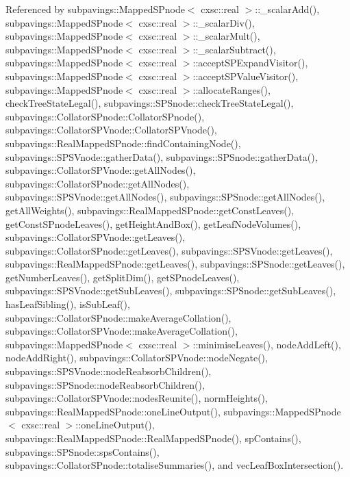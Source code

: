 \-Referenced by subpavings\-::\-Mapped\-S\-Pnode$<$ cxsc\-::real $>$\-::\-\_\-scalar\-Add(), subpavings\-::\-Mapped\-S\-Pnode$<$ cxsc\-::real $>$\-::\-\_\-scalar\-Div(), subpavings\-::\-Mapped\-S\-Pnode$<$ cxsc\-::real $>$\-::\-\_\-scalar\-Mult(), subpavings\-::\-Mapped\-S\-Pnode$<$ cxsc\-::real $>$\-::\-\_\-scalar\-Subtract(), subpavings\-::\-Mapped\-S\-Pnode$<$ cxsc\-::real $>$\-::accept\-S\-P\-Expand\-Visitor(), subpavings\-::\-Mapped\-S\-Pnode$<$ cxsc\-::real $>$\-::accept\-S\-P\-Value\-Visitor(), subpavings\-::\-Mapped\-S\-Pnode$<$ cxsc\-::real $>$\-::allocate\-Ranges(), check\-Tree\-State\-Legal(), subpavings\-::\-S\-P\-Snode\-::check\-Tree\-State\-Legal(), subpavings\-::\-Collator\-S\-Pnode\-::\-Collator\-S\-Pnode(), subpavings\-::\-Collator\-S\-P\-Vnode\-::\-Collator\-S\-P\-Vnode(), subpavings\-::\-Real\-Mapped\-S\-Pnode\-::find\-Containing\-Node(), subpavings\-::\-S\-P\-S\-Vnode\-::gather\-Data(), subpavings\-::\-S\-P\-Snode\-::gather\-Data(), subpavings\-::\-Collator\-S\-P\-Vnode\-::get\-All\-Nodes(), subpavings\-::\-Collator\-S\-Pnode\-::get\-All\-Nodes(), subpavings\-::\-S\-P\-S\-Vnode\-::get\-All\-Nodes(), subpavings\-::\-S\-P\-Snode\-::get\-All\-Nodes(), get\-All\-Weights(), subpavings\-::\-Real\-Mapped\-S\-Pnode\-::get\-Const\-Leaves(), get\-Const\-S\-Pnode\-Leaves(), get\-Height\-And\-Box(), get\-Leaf\-Node\-Volumes(), subpavings\-::\-Collator\-S\-P\-Vnode\-::get\-Leaves(), subpavings\-::\-Collator\-S\-Pnode\-::get\-Leaves(), subpavings\-::\-S\-P\-S\-Vnode\-::get\-Leaves(), subpavings\-::\-Real\-Mapped\-S\-Pnode\-::get\-Leaves(), subpavings\-::\-S\-P\-Snode\-::get\-Leaves(), get\-Number\-Leaves(), get\-Split\-Dim(), get\-S\-Pnode\-Leaves(), subpavings\-::\-S\-P\-S\-Vnode\-::get\-Sub\-Leaves(), subpavings\-::\-S\-P\-Snode\-::get\-Sub\-Leaves(), has\-Leaf\-Sibling(), is\-Sub\-Leaf(), subpavings\-::\-Collator\-S\-Pnode\-::make\-Average\-Collation(), subpavings\-::\-Collator\-S\-P\-Vnode\-::make\-Average\-Collation(), subpavings\-::\-Mapped\-S\-Pnode$<$ cxsc\-::real $>$\-::minimise\-Leaves(), node\-Add\-Left(), node\-Add\-Right(), subpavings\-::\-Collator\-S\-P\-Vnode\-::node\-Negate(), subpavings\-::\-S\-P\-S\-Vnode\-::node\-Reabsorb\-Children(), subpavings\-::\-S\-P\-Snode\-::node\-Reabsorb\-Children(), subpavings\-::\-Collator\-S\-P\-Vnode\-::nodes\-Reunite(), norm\-Heights(), subpavings\-::\-Real\-Mapped\-S\-Pnode\-::one\-Line\-Output(), subpavings\-::\-Mapped\-S\-Pnode$<$ cxsc\-::real $>$\-::one\-Line\-Output(), subpavings\-::\-Real\-Mapped\-S\-Pnode\-::\-Real\-Mapped\-S\-Pnode(), sp\-Contains(), subpavings\-::\-S\-P\-Snode\-::sps\-Contains(), subpavings\-::\-Collator\-S\-Pnode\-::totalise\-Summaries(), and vec\-Leaf\-Box\-Intersection().


